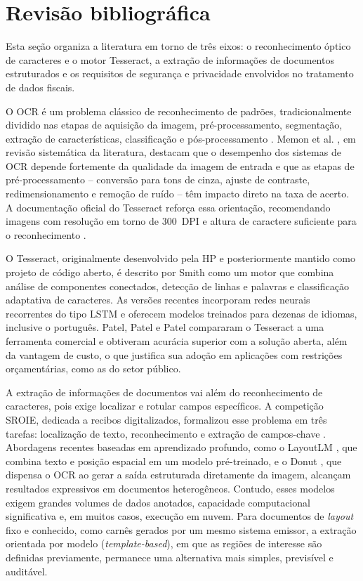 \documentclass[article,12pt,oneside,a4paper,english,brazil]{abntex2}
\begin{document}
\section{Revisão bibliográfica}\label{sec:revisao}

Esta seção organiza a literatura em torno de três eixos: o reconhecimento óptico de
caracteres e o motor Tesseract, a extração de informações de documentos estruturados e
os requisitos de segurança e privacidade envolvidos no tratamento de dados fiscais.

O OCR é um problema clássico de reconhecimento de padrões, tradicionalmente dividido nas
etapas de aquisição da imagem, pré-processamento, segmentação, extração de
características, classificação e pós-processamento \cite{islam2017}. Memon et al.
\cite{memon2020}, em revisão sistemática da literatura, destacam que o desempenho dos
sistemas de OCR depende fortemente da qualidade da imagem de entrada e que as etapas de
pré-processamento -- conversão para tons de cinza, ajuste de contraste, redimensionamento
e remoção de ruído -- têm impacto direto na taxa de acerto. A documentação oficial do
Tesseract reforça essa orientação, recomendando imagens com resolução em torno de
300~DPI e altura de caractere suficiente para o reconhecimento
\cite{tessdocqualidade}.

O Tesseract, originalmente desenvolvido pela HP e posteriormente mantido como projeto de
código aberto, é descrito por Smith \cite{smith2007} como um motor que combina análise
de componentes conectados, detecção de linhas e palavras e classificação adaptativa de
caracteres. As versões recentes incorporam redes neurais recorrentes do tipo LSTM e
oferecem modelos treinados para dezenas de idiomas, inclusive o português. Patel, Patel
e Patel \cite{patel2012} compararam o Tesseract a uma ferramenta comercial e obtiveram
acurácia superior com a solução aberta, além da vantagem de custo, o que justifica sua
adoção em aplicações com restrições orçamentárias, como as do setor público.

A extração de informações de documentos vai além do reconhecimento de caracteres,
pois exige localizar e rotular campos específicos. A competição SROIE, dedicada a
recibos digitalizados, formalizou esse problema em três tarefas: localização de texto,
reconhecimento e extração de campos-chave \cite{huang2019sroie}. Abordagens recentes
baseadas em aprendizado profundo, como o LayoutLM \cite{xu2020layoutlm}, que combina
texto e posição espacial em um modelo pré-treinado, e o Donut \cite{kim2022donut}, que
dispensa o OCR ao gerar a saída estruturada diretamente da imagem, alcançam resultados
expressivos em documentos heterogêneos. Contudo, esses modelos exigem grandes volumes de
dados anotados, capacidade computacional significativa e, em muitos casos, execução em
nuvem. Para documentos de \textit{layout} fixo e conhecido, como carnês gerados por um
mesmo sistema emissor, a extração orientada por modelo (\textit{template-based}), em que
as regiões de interesse são definidas previamente, permanece uma alternativa mais
simples, previsível e auditável.
\end{document}
